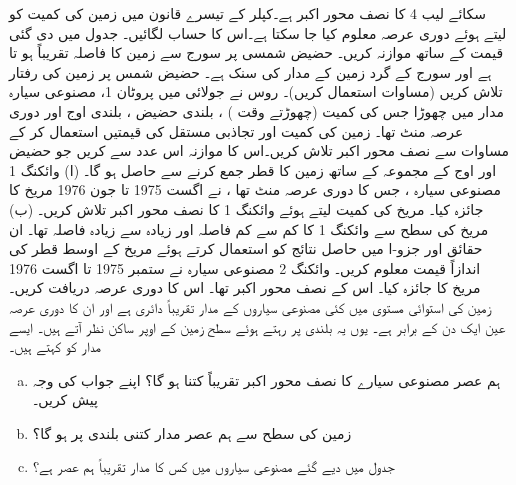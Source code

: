 سکائے  لیب  4 کا نصف محور اکبر  ہے۔کپلر کے تیسرے قانون  میں زمین کی کمیت کو  لیتے ہوئے دوری عرصہ  معلوم کیا جا سکتا ہے۔اس کا حساب لگائیں۔ جدول  میں دی گئی  قیمت کے ساتھ موازنہ کریں۔
حضیض شمسی پر سورج سے زمین کا فاصلہ تقریباً  ہو تا ہے اور  سورج کے گرد زمین کے مدار کی سنک  ہے۔ حضیض شمس پر زمین کی رفتار  تلاش کریں (مساوات  استعمال کریں)۔
روس نے جولائی  میں پروٹان  1، مصنوعی سیارہ مدار میں چھوڑا جس کی کمیت  (چھوڑتے وقت ) ،  بلندی حضیض ، بلندی اوج  اور دوری عرصہ  منٹ  تھا۔  زمین کی کمیت اور تجاذبی مستقل  کی قیمتیں استعمال کر کے مساوات  سے  نصف محور اکبر   تلاش کریں۔اس کا موازنہ اس عدد سے کریں جو حضیض اور اوج کے مجموعہ کے ساتھ  زمین کا قطر جمع  کرنے سے حاصل ہو گا۔
(ا)  وائکنگ 1 مصنوعی سیارہ ، جس کا دوری عرصہ  منٹ تھا ، نے   اگست 1975 تا جون 1976 مریخ کا جائزہ  کیا۔  مریخ کی کمیت  لیتے ہوئے  وائکنگ 1 کا نصف محور اکبر تلاش کریں۔ (ب) مریخ کی سطح  سے وائکنگ 1 کا کم سے کم فاصلہ  اور زیادہ سے زیادہ فاصلہ   تھا۔ ان حقائق اور جزو-ا میں حاصل نتائج کو  استعمال کرتے ہوئے مریخ کے اوسط  قطر کی   اندازاً  قیمت معلوم کریں۔
وائکنگ 2  مصنوعی سیارہ نے ستمبر 1975 تا اگست 1976  مریخ کا جائزہ  کیا۔ اس کے نصف محور اکبر  تھا۔ اس کا دوری عرصہ دریافت کریں۔
\\
زمین کی استوائی مستوی میں کئی مصنوعی سیاروں  کے مدار تقریباً دائری ہے اور ان کا دوری عرصہ عین  ایک دن کے برابر ہے۔  یوں یہ بلندی پر رہتے ہوئے   سطح زمین کے اوپر ساکن نظر آتے ہیں۔ ایسے مدار کو  کہتے ہیں۔
\begin{enumerate}[a.]
\item
ہم عصر مصنوعی سیارے کا نصف محور اکبر تقریباً کتنا ہو گا؟ اپنے جواب کی وجہ پیش کریں۔
\item
زمین کی سطح سے ہم عصر مدار کتنی  بلندی پر ہو گا؟
\item
جدول   میں دیے گئے مصنوعی سیاروں میں کس کا مدار تقریباً ہم عصر ہے؟
\end{enumerate}

